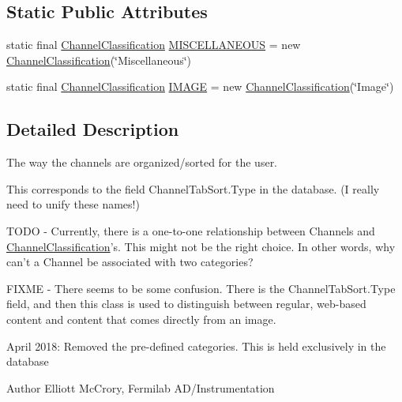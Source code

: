 \subsection*{Static Public Attributes}
\begin{DoxyCompactItemize}
\item 
static final \hyperlink{classgov_1_1fnal_1_1ppd_1_1dd_1_1changer_1_1ChannelClassification}{Channel\-Classification} \hyperlink{classgov_1_1fnal_1_1ppd_1_1dd_1_1changer_1_1ChannelClassification_aff2ea773d09e0647abdcb5642bbbec0b}{M\-I\-S\-C\-E\-L\-L\-A\-N\-E\-O\-U\-S} = new \hyperlink{classgov_1_1fnal_1_1ppd_1_1dd_1_1changer_1_1ChannelClassification}{Channel\-Classification}(\char`\"{}Miscellaneous\char`\"{})
\item 
static final \hyperlink{classgov_1_1fnal_1_1ppd_1_1dd_1_1changer_1_1ChannelClassification}{Channel\-Classification} \hyperlink{classgov_1_1fnal_1_1ppd_1_1dd_1_1changer_1_1ChannelClassification_a368a93f6624e94cdd2a80b67e37d6187}{I\-M\-A\-G\-E} = new \hyperlink{classgov_1_1fnal_1_1ppd_1_1dd_1_1changer_1_1ChannelClassification}{Channel\-Classification}(\char`\"{}Image\char`\"{})
\end{DoxyCompactItemize}


\subsection{Detailed Description}
The way the channels are organized/sorted for the user.

This corresponds to the field Channel\-Tab\-Sort.\-Type in the database. (I really need to unify these names!)

T\-O\-D\-O -\/ Currently, there is a one-\/to-\/one relationship between Channels and \hyperlink{classgov_1_1fnal_1_1ppd_1_1dd_1_1changer_1_1ChannelClassification}{Channel\-Classification}'s. This might not be the right choice. In other words, why can't a Channel be associated with two categories?

F\-I\-X\-M\-E -\/ There seems to be some confusion. There is the Channel\-Tab\-Sort.\-Type field, and then this class is used to distinguish between regular, web-\/based content and content that comes directly from an image.

April 2018\-: Removed the pre-\/defined categories. This is held exclusively in the database

\begin{DoxyAuthor}{Author}
Elliott Mc\-Crory, Fermilab A\-D/\-Instrumentation 
\end{DoxyAuthor}


